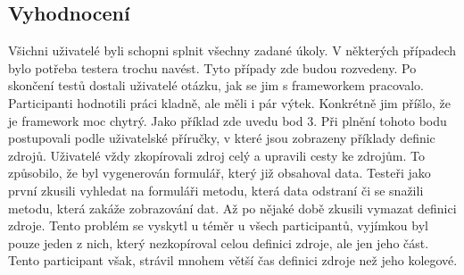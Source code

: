 \subsection{Vyhodnocení}
Všichni uživatelé byli schopni splnit všechny zadané úkoly. V některých případech bylo potřeba testera trochu navést. Tyto případy zde budou rozvedeny. Po skončení testů dostali uživatelé otázku, jak se jim s frameworkem pracovalo. Participanti hodnotili práci kladně, ale měli i pár výtek. Konkrétně jim příšlo, že je framework moc chytrý. Jako příklad zde uvedu bod 3. Při plnění tohoto bodu postupovali podle uživatelské příručky, v které jsou zobrazeny příklady definic zdrojů. Uživatelé vždy zkopírovali zdroj celý a upravili cesty ke zdrojům. To způsobilo, že byl vygenerován formulář, který již obsahoval data. Testeři jako první zkusili vyhledat na formuláři metodu, která data odstraní či se snažili metodu, která zakáže zobrazování dat. Až po nějaké době zkusili vymazat definici zdroje. Tento problém se vyskytl u téměr u všech participantů, vyjímkou byl pouze jeden z nich, který nezkopíroval celou definici zdroje, ale jen jeho část. Tento participant však, strávil mnohem větší čas definici zdroje než jeho kolegové.

